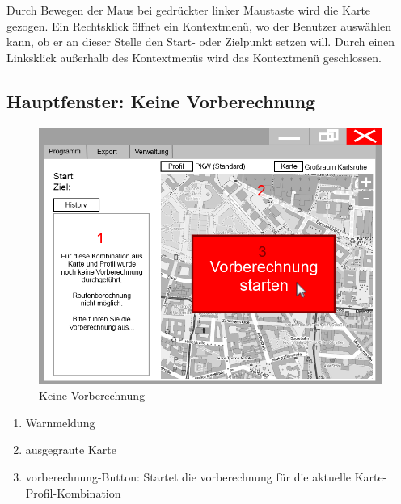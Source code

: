 \documentclass[a4paper, 11pt]{article}
\begin{document}
Durch Bewegen der Maus bei gedrückter linker Maustaste wird die Karte gezogen. Ein Rechtsklick öffnet ein Kontextmenü, wo der Benutzer auswählen kann, ob er an dieser Stelle den Start- oder Zielpunkt setzen will. Durch einen Linksklick außerhalb des Kontextmenüs wird das Kontextmenü geschlossen.

\subsection{Hauptfenster: Keine Vorberechnung}
\begin{figure}[H]
\centering
\includegraphics[width=0.7\linewidth]{mockup_screenshot_nicht_berechnet}
\caption{Keine Vorberechnung}
\label{fig:mockupscreenshotkeinevorberechnung}
\end{figure}
\begin{enumerate}
\item Warnmeldung
\item ausgegraute Karte
\item \gls{vorberechnung}-Button: Startet die \gls{vorberechnung} für die aktuelle Karte-Profil-Kombination
\end{enumerate}
\end{document}
